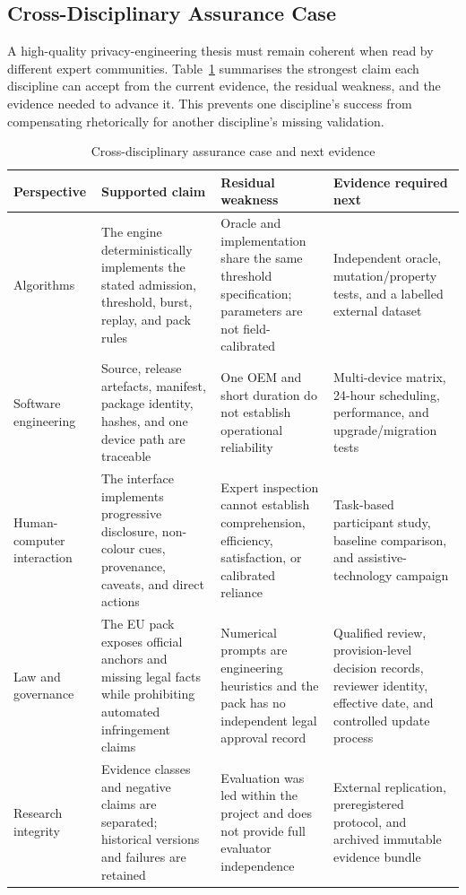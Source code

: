 \subsection{Cross-Disciplinary Assurance Case}

A high-quality privacy-engineering thesis must remain coherent when read by different expert communities. Table~\ref{tab:assurance-case} summarises the strongest claim each discipline can accept from the current evidence, the residual weakness, and the evidence needed to advance it. This prevents one discipline's success from compensating rhetorically for another discipline's missing validation.

\begin{table}[H]
\centering
\caption{Cross-disciplinary assurance case and next evidence}
\label{tab:assurance-case}
\scriptsize
\begin{tabular}{>{\raggedright\arraybackslash}p{}>{\raggedright\arraybackslash}p{}>{\raggedright\arraybackslash}p{}>{\raggedright\arraybackslash}p{}}
\toprule
Perspective & Supported claim & Residual weakness & Evidence required next \\
\midrule
Algorithms & The engine deterministically implements the stated admission, threshold, burst, replay, and pack rules & Oracle and implementation share the same threshold specification; parameters are not field-calibrated & Independent oracle, mutation/property tests, and a labelled external dataset \\
Software engineering & Source, release artefacts, manifest, package identity, hashes, and one device path are traceable & One OEM and short duration do not establish operational reliability & Multi-device matrix, 24-hour scheduling, performance, and upgrade/migration tests \\
Human-computer interaction & The interface implements progressive disclosure, non-colour cues, provenance, caveats, and direct actions & Expert inspection cannot establish comprehension, efficiency, satisfaction, or calibrated reliance & Task-based participant study, baseline comparison, and assistive-technology campaign \\
Law and governance & The EU pack exposes official anchors and missing legal facts while prohibiting automated infringement claims & Numerical prompts are engineering heuristics and the pack has no independent legal approval record & Qualified review, provision-level decision records, reviewer identity, effective date, and controlled update process \\
Research integrity & Evidence classes and negative claims are separated; historical versions and failures are retained & Evaluation was led within the project and does not provide full evaluator independence & External replication, preregistered protocol, and archived immutable evidence bundle \\
\bottomrule
\end{tabular}
\end{table}

